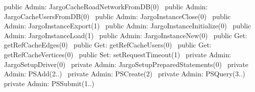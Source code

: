 public \LA{}Admin: JargoCacheRoadNetworkFromDB(0)~{\nwtagstyle{}}\RA{}
public \LA{}Admin: JargoCacheUsersFromDB(0)~{\nwtagstyle{}}\RA{}
public \LA{}Admin: JargoInstanceClose(0)~{\nwtagstyle{}}\RA{}
public \LA{}Admin: JargoInstanceExport(1)~{\nwtagstyle{}}\RA{}
public \LA{}Admin: JargoInstanceInitialize(0)~{\nwtagstyle{}}\RA{}
public \LA{}Admin: JargoInstanceLoad(1)~{\nwtagstyle{}}\RA{}
public \LA{}Admin: JargoInstanceNew(0)~{\nwtagstyle{}}\RA{}
public \LA{}Get: getRefCacheEdges(0)~{\nwtagstyle{}}\RA{}
public \LA{}Get: getRefCacheUsers(0)~{\nwtagstyle{}}\RA{}
public \LA{}Get: getRefCacheVertices(0)~{\nwtagstyle{}}\RA{}
public \LA{}Set: setRequestTimeout(1)~{\nwtagstyle{}}\RA{}
private \LA{}Admin: JargoSetupDriver(0)~{\nwtagstyle{}}\RA{}
private \LA{}Admin: JargoSetupPreparedStatements(0)~{\nwtagstyle{}}\RA{}
private \LA{}Admin: PSAdd(2..)~{\nwtagstyle{}}\RA{}
private \LA{}Admin: PSCreate(2)~{\nwtagstyle{}}\RA{}
private \LA{}Admin: PSQuery(3..)~{\nwtagstyle{}}\RA{}
private \LA{}Admin: PSSubmit(1..)~{\nwtagstyle{}}\RA{}
\nwendcode{}\nwdocspar

